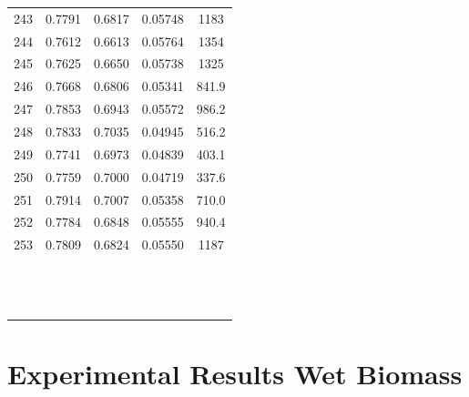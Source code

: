 \documentclass[11pt,twocolumn]{article}
\begin{document}
\begin{center}
\begin{tabular}{ccccc}
243    &     0.7791 &      0.6817 &        0.05748 &             1183 \\
244    &     0.7612 &      0.6613 &        0.05764 &             1354 \\
245    &     0.7625 &      0.6650 &        0.05738 &             1325 \\
246    &     0.7668 &      0.6806 &        0.05341 &            841.9 \\
247    &     0.7853 &      0.6943 &        0.05572 &            986.2 \\
248    &     0.7833 &      0.7035 &        0.04945 &            516.2 \\
249    &     0.7741 &      0.6973 &        0.04839 &            403.1 \\
250    &     0.7759 &      0.7000 &        0.04719 &            337.6 \\
251    &     0.7914 &      0.7007 &        0.05358 &            710.0 \\
252    &     0.7784 &      0.6848 &        0.05555 &            940.4 \\
253    &     0.7809 &      0.6824 &        0.05550 &             1187 \\
\bottomrule
{}	&	{}	&	{}	&	{}	&	{}	\\
{}	&	{}	&	{}	&	{}	&	{}	\\
{}	&	{}	&	{}	&	{}	&	{}	\\
{}	&	{}	&	{}	&	{}	&	{}	\\
{}	&	{}	&	{}	&	{}	&	{}	\\
{}	&	{}	&	{}	&	{}	&	{}	\\
{}	&	{}	&	{}	&	{}	&	{}	\\
{}	&	{}	&	{}	&	{}	&	{}	\\
{}	&	{}	&	{}	&	{}	&	{}	\\
{}	&	{}	&	{}	&	{}	&	{}	\\
{}	&	{}	&	{}	&	{}	&	{}	\\
{}	&	{}	&	{}	&	{}	&	{}	\\
{}	&	{}	&	{}	&	{}	&	{}	\\
\end{tabular}
\end{center}

\section{Experimental Results Wet Biomass}
\end{document}
